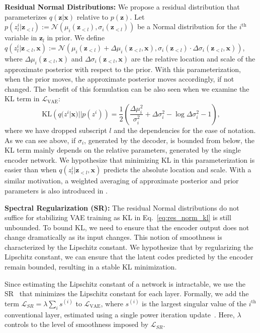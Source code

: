 \documentclass{article}
\newcommand{\x}{{\pmb{x}}}
\newcommand{\z}{{\pmb{z}}}
\newcommand{\KL}[2]{\text{KL}\!\left(#1 || #2\right)}
\renewcommand{\L}{{\mathcal{L}}}
\newcommand{\N}{{\mathcal{N}}}
\begin{document}
\textbf{Residual Normal Distributions:}
We propose a residual distribution that parameterizes $q(\z|\x)$ relative to $p(\z)$. Let $p(z^i_l|\z_{<l}) := \N \left(\mu_i(\z_{<l}), \sigma_i(\z_{<l}) \right)$ be a Normal distribution for the $i^\textrm{th}$ variable in $\z_l$ in prior. We define
$q(z^i_l|\z_{<l}, \x) := \N \left(\mu_i(\z_{<l}) + \Delta \mu_i(\z_{<l}, \x), \sigma_i(\z_{<l}) \cdot\Delta \sigma_i(\z_{<l}, \x) \right)$,    
where $\Delta \mu_i(\z_{<l}, \x)$ and $\Delta \sigma_i(\z_{<l}, \x)$ are the relative location and scale of the approximate posterior with respect to the prior. With this parameterization, when the prior moves, the approximate posterior moves accordingly, if not changed. The benefit of this formulation can be also seen when we examine the KL term in $\L_{\text{VAE}}$:
\begin{equation}\label{eq:res_norm_kl}
\KL{q(z^i|\x)}{p(z^i)} =  \frac{1}{2}\left( \frac{\Delta \mu_i^2}{\sigma_i^2} + \Delta \sigma_i^2 - \log \Delta \sigma_i^2 - 1  \right),
\end{equation}
where we have dropped subscript $l$ and the dependencies for the ease of notation. As we can see above, if $\sigma_i$, generated by the decoder, is bounded from below, the KL term mainly depends on the relative parameters, generated by the single encoder network. We hypothesize that minimizing KL in this parameterization is easier than when $q(z^i_l|\z_{<l}, \x)$ predicts the absolute location and scale. With a similar motivation, a weighted averaging of approximate posterior and prior parameters is also introduced in \cite{sonderby2016ladder}.



\textbf{Spectral Regularization (SR):}
The residual Normal distributions do not suffice for stabilizing VAE training as KL in Eq.~\ref{eq:res_norm_kl} is still unbounded. To bound KL, we need to ensure that the encoder output does not change dramatically as its input changes. This notion of smoothness is characterized by the Lipschitz constant. We hypothesize that by regularizing the Lipschitz constant, we can ensure that the latent codes predicted by the encoder remain bounded, resulting in a stable KL minimization. 

Since estimating the Lipschitz constant of a network is intractable, we use the SR~\cite{yoshida2017spectral} that minimizes the Lipschitz constant for each layer. Formally, we add the term $\L_{SR} = \lambda \sum_i s^{(i)}$ to $\L_{\text{VAE}}$, where $s^{(i)}$ is the largest singular value of the $i^\textrm{th}$ conventional layer, estimated using a single power iteration update~\cite{yoshida2017spectral, miyato2018spectral}. Here, $\lambda$ controls to the level of smoothness imposed by $\L_{SR}$.
\end{document}
